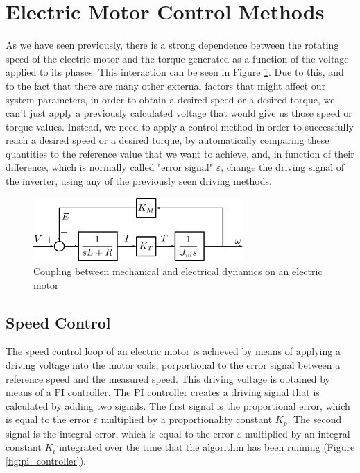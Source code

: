 \section{Electric Motor Control Methods}

As we have seen previously, there is a strong dependence between the rotating speed of the electric motor and the torque generated as a function of the voltage applied to its phases. This interaction can be seen in Figure \ref{fig:ele_mech_dyn}. Due to this, and to the fact that there are many other external factors that might affect our system parameters, in order to obtain a desired speed or a desired torque, we can't just apply a previously calculated voltage that would give us those speed or torque values. Instead, we need to apply a control method in order to successfully reach a desired speed or a desired torque, by automatically comparing these quantities to the reference value that we want to achieve, and, in function of their difference, which is normally called "error signal" $\varepsilon$, change the driving signal of the inverter, using any of the previously seen driving methods.

\begin{figure}[htbp]
\centering
\includegraphics[width=8cm]{Images/ele_mech_dyn.png} 
\caption[Electromechanical Dynamics Coupling]{Coupling between mechanical and electrical dynamics on an electric motor}
\label{fig:ele_mech_dyn}
\end{figure}

\subsection{Speed Control}\label{sub:speed_control}

The speed control loop of an electric motor is achieved by means of applying a driving voltage into the motor coils, porportional to the error signal between a reference speed and the measured speed. This driving voltage is obtained by means of a \acf{PI} controller. The \ac{PI} controller creates a driving signal that is calculated by adding two signals. The first signal is the proportional error, which is equal to the error $\varepsilon$ multiplied by a proportionality constant $K_{p}$. The second signal is the integral error, which is equal to the error $\varepsilon$ multiplied by an integral constant $K_{i}$ integrated over the time that the algorithm has been running (Figure \ref{fig:pi_controller}).

